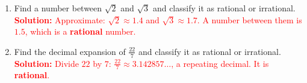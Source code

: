 \documentclass[10pt]{article}
\begin{document}
\begin{tcolorbox}[colframe=black!60, colback=white, 
coltitle=black, colbacktitle=black!15, fonttitle=\bfseries\Large, 
title=Exercises, halign title=center, left=10pt, right=10pt, top=10pt, bottom=60pt]
\begin{enumerate}[itemsep=3em]
    \item Find a number between \( \sqrt{2} \) and \( \sqrt{3} \) and classify it as rational or irrational.\\
    \textcolor{red}{\textbf{Solution:} Approximate: \( \sqrt{2} \approx 1.4 \) and \( \sqrt{3} \approx 1.7 \). A number between them is \(1.5\), which is a \textbf{rational} number.}

    \item Find the decimal expansion of \( \frac{22}{7} \) and classify it as rational or irrational.\\
    \textcolor{red}{\textbf{Solution:} Divide \(22\) by \(7\): \( \frac{22}{7} \approx 3.142857\ldots \), a repeating decimal. It is \textbf{rational}.}
\end{enumerate}
\end{tcolorbox}

\vspace{1em}
\end{document}
